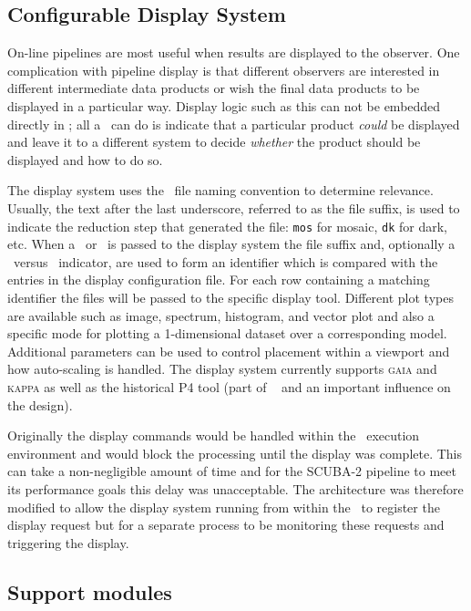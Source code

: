\documentclass[final,authoryear,5p,times,twocolumn]{elsarticle}
\begin{document}
\subsection{Configurable Display System}

On-line pipelines are most useful when results are displayed to the
observer. One complication with pipeline display is that different
observers are interested in different intermediate data products or
wish the final data products to be displayed in a particular
way. Display logic such as this can not be embedded directly in
\primitives; all a \primitive\ can do is indicate that a particular
product \emph{could} be displayed and leave it to a different system
to decide \emph{whether} the product should be displayed and how to
do so.

The display system uses the \oracdr\ file naming convention to
determine relevance. Usually, the text after the last underscore,
referred to as the file suffix, is used to indicate the reduction step
that generated the file: \texttt{mos} for mosaic, \texttt{dk} for
dark, etc. When a \Frame\ or \Group\ is passed to the display system
the file suffix and, optionally a \Group\ versus \Frame\ indicator,
are used to form an identifier which is compared with the entries in
the display configuration file. For each row
containing a matching identifier the files will be passed to the
specific display tool. Different plot types are available such as
image, spectrum, histogram, and vector plot and also a specific mode
for plotting a 1-dimensional dataset over a corresponding model. Additional
parameters can be used to control placement within a viewport and how
auto-scaling is handled. The display system currently supports \textsc{gaia}
\citep[][]{2009ASPC..411..575D} and \textsc{kappa}
\citep[][]{SUN95} as well as the historical P4 tool
(part of \cgsdr\ \citep{SUN27} and an important influence on the
design).

Originally the display commands would be handled within the \recipe\
execution environment and would block the processing until the display
was complete. This can take a non-negligible amount of time and for the
SCUBA-2 pipeline to meet its performance goals this delay was
unacceptable. The architecture was therefore modified to allow the
display system running from within the \recipe\ to register the
display request but for a separate process to be monitoring these
requests and triggering the display.

\subsection{Support modules}
\end{document}
